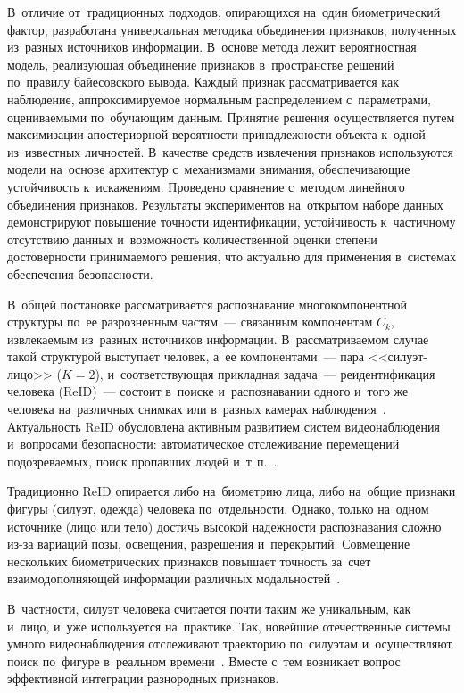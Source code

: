 В~отличие от~традиционных подходов, опирающихся на~один биометрический
фактор, разработана универсальная методика объединения признаков,
полученных из~разных источников информации. В~основе метода лежит
вероятностная модель, реализующая объединение признаков в~пространстве
решений по~правилу байесовского вывода. Каждый признак рассматривается
как наблюдение, аппроксимируемое нормальным распределением
с~параметрами, оцениваемыми по~обучающим данным. Принятие решения
осуществляется путем максимизации апостериорной вероятности
принадлежности объекта к~одной из~известных личностей. В~качестве
средств извлечения признаков используются модели на~основе архитектур
с~механизмами внимания, обеспечивающие устойчивость к~искажениям.
Проведено сравнение с~методом линейного объединения признаков.
Результаты экспериментов на~открытом наборе данных демонстрируют
повышение точности идентификации, устойчивость к~частичному отсутствию
данных и~возможность количественной оценки степени достоверности
принимаемого решения, что актуально для применения в~системах
обеспечения безопасности.

В~общей постановке рассматривается распознавание многокомпонентной
структуры по~ее разрозненным частям~--- связанным компонентам $C_k$,
извлекаемым из~разных источников информации. В~рассматриваемом случае
такой структурой выступает человек, а~ее компонентами~--- пара
<<силуэт-лицо>> ($K=2$), и~соответствующая прикладная задача~---
реидентификация человека (ReID)~--- состоит
в~поиске и~распознавании одного и~того же человека на~различных снимках
или в~разных камерах наблюдения~\cite{Khachumov2015face}. Актуальность
ReID обусловлена активным развитием систем видеонаблюдения и~вопросами
безопасности: автоматическое отслеживание перемещений подозреваемых,
поиск пропавших людей и~т.\,п.~\cite{Vezzani2013reidsurvey}.

Традиционно ReID опирается либо на~биометрию лица, либо на~общие
признаки фигуры (силуэт, одежда) человека по~отдельности. Однако,
только на~одном источнике (лицо или тело) достичь высокой надежности
распознавания сложно из-за вариаций позы, освещения, разрешения
и~перекрытий. Совмещение нескольких биометрических признаков повышает
точность за~счет взаимодополняющей информации различных
модальностей~\cite{Irfan2022multimodal,Koo2018multimodal}.

В~частности, силуэт человека считается почти таким же уникальным, как
и~лицо, и~уже используется на~практике. Так, новейшие отечественные
системы умного видеонаблюдения отслеживают траекторию по~силуэтам
и~осуществляют поиск по~фигуре в~реальном
времени~\cite{Telenkov2021silhouette}. Вместе с~тем возникает вопрос
эффективной интеграции разнородных признаков.


